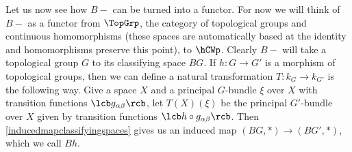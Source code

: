 Let us now see how $B-$ can be turned into a functor. For now we will think of $B-$ as a functor from $\TopGrp$, the category of topological groups and continuous homomorphisms (these spaces are automatically based at the identity and homomorphisms preserve this point), to $\hCWp$. Clearly $B-$ will take a topological group $G$ to its classifying space $BG$. If $h : G \rightarrow G'$ is a morphism of topological groups, then we can define a natural transformation $T : k_G \rightarrow k_{G'}$ is the following way. Give a space $X$ and a principal $G$-bundle $\xi$ over $X$ with transition functions $\lcb g_{\alpha\beta} \rcb$, let $T(X)(\xi)$ be the principal $G'$-bundle over $X$ given by transition functions $\lcb h \circ g_{\alpha\beta} \rcb$. Then \ref{inducedmapclassifyingspaces} gives us an induced map $(BG,*) \rightarrow (BG',*)$, which we call $Bh$.

